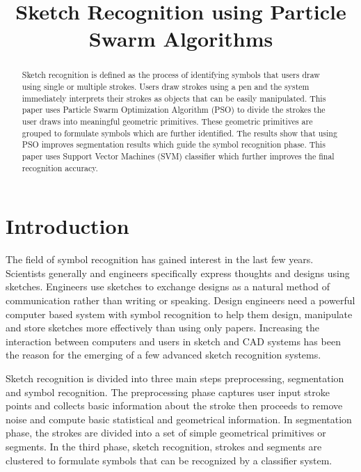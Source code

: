 \documentclass{article}
\title{Sketch Recognition using Particle Swarm Algorithms}
\begin{document}
\maketitle
\begin{abstract}
Sketch recognition is defined as the process of identifying symbols that users draw using single or multiple strokes. Users draw strokes using a pen and the system immediately interprets their strokes as objects that can be easily manipulated. This paper uses Particle Swarm Optimization Algorithm (PSO) to divide the strokes the user draws into meaningful geometric primitives. These geometric primitives are grouped to formulate symbols which are further identified. The results show that using PSO improves segmentation results which guide the symbol recognition phase. This paper uses Support Vector Machines (SVM) classifier which further improves the final recognition accuracy.  
\end{abstract}
\section{Introduction}
The field of symbol recognition has gained interest in the last few years. Scientists generally and engineers specifically express thoughts and designs using sketches. Engineers use sketches to exchange designs as a natural method of communication rather than writing or speaking. Design engineers need a powerful computer based system with symbol recognition to help them design, manipulate and store sketches more effectively than using only papers. Increasing the interaction between computers and users in sketch and CAD systems has been the reason for the emerging of a few advanced sketch recognition systems. 

Sketch recognition is divided into three main steps preprocessing, segmentation and symbol recognition. The preprocessing phase captures user input stroke points and collects basic information about the stroke then proceeds to remove noise and compute basic statistical and geometrical information. In segmentation phase, the strokes are divided into a set of simple geometrical primitives or segments. In the third phase, sketch recognition, strokes and segments are clustered to formulate symbols that can be recognized by a classifier system. 
\end{document}
